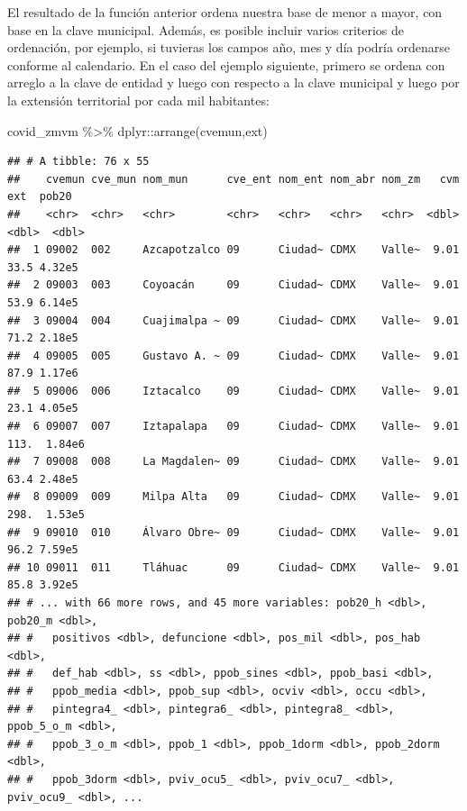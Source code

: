 \documentclass[
  11pt,
  oneside]{book}
\newenvironment{Shaded}{\begin{snugshade}}{\end{snugshade}}
\newcommand{\FunctionTok}[1]{\textcolor[rgb]{0.00,0.00,0.00}{#1}}
\newcommand{\NormalTok}[1]{#1}
\newcommand{\SpecialCharTok}[1]{\textcolor[rgb]{0.00,0.00,0.00}{#1}}
\begin{document}
El resultado de la función anterior ordena nuestra base de menor a mayor, con base en la clave municipal. Además, es posible incluir varios criterios de ordenación, por ejemplo, si tuvieras los campos año, mes y día podría ordenarse conforme al calendario. En el caso del ejemplo siguiente, primero se ordena con arreglo a la clave de entidad y luego con respecto a la clave municipal y luego por la extensión territorial por cada mil habitantes:

\begin{Shaded}
\begin{Highlighting}[]
\NormalTok{covid\_zmvm }\SpecialCharTok{\%\textgreater{}\%}\NormalTok{ dplyr}\SpecialCharTok{::}\FunctionTok{arrange}\NormalTok{(cvemun,ext)}
\end{Highlighting}
\end{Shaded}

\begin{verbatim}
## # A tibble: 76 x 55
##    cvemun cve_mun nom_mun      cve_ent nom_ent nom_abr nom_zm   cvm   ext  pob20
##    <chr>  <chr>   <chr>        <chr>   <chr>   <chr>   <chr>  <dbl> <dbl>  <dbl>
##  1 09002  002     Azcapotzalco 09      Ciudad~ CDMX    Valle~  9.01  33.5 4.32e5
##  2 09003  003     Coyoacán     09      Ciudad~ CDMX    Valle~  9.01  53.9 6.14e5
##  3 09004  004     Cuajimalpa ~ 09      Ciudad~ CDMX    Valle~  9.01  71.2 2.18e5
##  4 09005  005     Gustavo A. ~ 09      Ciudad~ CDMX    Valle~  9.01  87.9 1.17e6
##  5 09006  006     Iztacalco    09      Ciudad~ CDMX    Valle~  9.01  23.1 4.05e5
##  6 09007  007     Iztapalapa   09      Ciudad~ CDMX    Valle~  9.01 113.  1.84e6
##  7 09008  008     La Magdalen~ 09      Ciudad~ CDMX    Valle~  9.01  63.4 2.48e5
##  8 09009  009     Milpa Alta   09      Ciudad~ CDMX    Valle~  9.01 298.  1.53e5
##  9 09010  010     Álvaro Obre~ 09      Ciudad~ CDMX    Valle~  9.01  96.2 7.59e5
## 10 09011  011     Tláhuac      09      Ciudad~ CDMX    Valle~  9.01  85.8 3.92e5
## # ... with 66 more rows, and 45 more variables: pob20_h <dbl>, pob20_m <dbl>,
## #   positivos <dbl>, defuncione <dbl>, pos_mil <dbl>, pos_hab <dbl>,
## #   def_hab <dbl>, ss <dbl>, ppob_sines <dbl>, ppob_basi <dbl>,
## #   ppob_media <dbl>, ppob_sup <dbl>, ocviv <dbl>, occu <dbl>,
## #   pintegra4_ <dbl>, pintegra6_ <dbl>, pintegra8_ <dbl>, ppob_5_o_m <dbl>,
## #   ppob_3_o_m <dbl>, ppob_1 <dbl>, ppob_1dorm <dbl>, ppob_2dorm <dbl>,
## #   ppob_3dorm <dbl>, pviv_ocu5_ <dbl>, pviv_ocu7_ <dbl>, pviv_ocu9_ <dbl>, ...
\end{verbatim}
\end{document}
